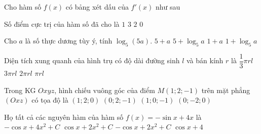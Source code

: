 \begin{ex}%
Cho hàm số $f(x)$ có bảng xét dấu của $f'(x)$  như sau
\begin{center}
\end{center}	
Số điểm cực trị của hàm số đã cho là
	\choice
	{$1$}
	{\True $3$}
	{$2$}
	{$0$}
\end{ex}

\begin{ex}%
Cho $a$ là số thực dương tùy ý, tính	$\log_5(5a)$.
	\choice
	{$5+a$}
	{$5+\log_5a$}
	{$1+a$}
	{\True $1+\log_5a$}
\end{ex}

\begin{ex}%
	Diện tích xung quanh của hình trụ có độ dài đường sinh $l$ và bán kính $r$ là
	\choice
	{$\dfrac{1}{3}\pi rl$}
	{$3\pi rl$}
	{\True $2\pi rl$}
	{$\pi rl$}
\end{ex}

\begin{ex}%
	Trong KG $Oxyz$, hình chiếu vuông góc của điểm $M(1;2;-1)$ trên mặt phẳng $(Oxz)$ có tọa	độ là
	\choice
	{$(1;2;0)$}
	{$(0;2;-1)$}
	{\True $(1;0;-1)$}
	{$(0;-2;0)$}
\end{ex}

\begin{ex}%
	Họ tất cả các nguyên hàm của hàm số $f(x)=-\sin x+4x$ là
	\choice
	{$-\cos x+4x^2+C$}
	{\True $\cos x+2x^2+C$}
	{$-\cos x+2x^2+C$}
	{$\cos x+4$}
\end{ex}

